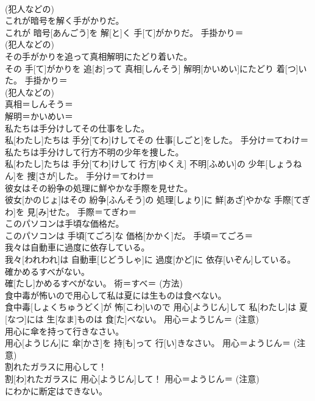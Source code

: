 \documentclass[8pt]{extreport}
\begin{document}
\begin{CJK}{UTF8}{min}
{\\	(犯人などの) 
\\	これが暗号を解く手がかりだ。	
\\	これが 暗号[あんごう]を 解[と]く 手[て]がかりだ。	手掛かり＝ 
\\	(犯人などの) 
\\	その手がかりを追って真相解明にたどり着いた。	
\\	その 手[て]がかりを 追[お]って 真相[しんそう] 解明[かいめい]にたどり 着[つ]いた。	手掛かり＝ 
\\	(犯人などの) 
\\	真相＝しんそう＝ 
\\	解明＝かいめい＝ 
\\	私たちは手分けしてその仕事をした。	
\\	私[わたし]たちは 手分[てわ]けしてその 仕事[しごと]をした。	手分け＝てわけ＝ 
\\	私たちは手分けして行方不明の少年を捜した。	
\\	私[わたし]たちは 手分[てわ]けして 行方[ゆくえ] 不明[ふめい]の 少年[しょうねん]を 捜[さが]した。	手分け＝てわけ＝ 
\\	彼女はその紛争の処理に鮮やかな手際を見せた。	
\\	彼女[かのじょ]はその 紛争[ふんそう]の 処理[しょり]に 鮮[あざ]やかな 手際[てぎわ]を 見[み]せた。	手際＝てぎわ＝ 
\\	このパソコンは手頃な価格だ。	
\\	このパソコンは 手頃[てごろ]な 価格[かかく]だ。	手頃＝てごろ＝ 
\\	我々は自動車に過度に依存している。	
\\	我々[われわれ]は 自動車[じどうしゃ]に 過度[かど]に 依存[いぞん]している。	
\\	確かめるすべがない。	
\\	確[たし]かめるすべがない。	術＝すべ＝ (方法) 
\\	食中毒が怖いので用心して私は夏には生ものは食べない。	
\\	食中毒[しょくちゅうどく]が 怖[こわ]いので 用心[ようじん]して 私[わたし]は 夏[なつ]には 生[なま]ものは 食[た]べない。	用心＝ようじん＝ (注意) 
\\	用心に傘を持って行きなさい。	
\\	用心[ようじん]に 傘[かさ]を 持[も]って 行[い]きなさい。	用心＝ようじん＝ (注意) 
\\	割れたガラスに用心して！	
\\	割[わ]れたガラスに 用心[ようじん]して！	用心＝ようじん＝ (注意) 
\\	にわかに断定はできない。	
}
\end{CJK}
\end{document}

